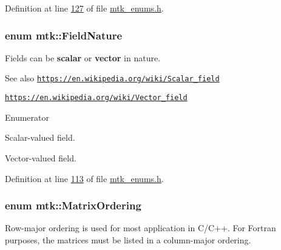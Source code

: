 Definition at line \hyperlink{mtk__enums_8h_source_l00127}{127} of file \hyperlink{mtk__enums_8h_source}{mtk\+\_\+enums.\+h}.

\hypertarget{group__c02-enums_ga4c54f2a329cfb4e56213b02a259d19e2}{
\subsubsection[{Field\+Nature}]{\setlength{\rightskip}{0pt plus 5cm}enum {\bf mtk\+::\+Field\+Nature}}}\label{group__c02-enums_ga4c54f2a329cfb4e56213b02a259d19e2}
Fields can be {\bfseries scalar} or {\bfseries vector} in nature.

\begin{DoxySeeAlso}{See also}
\href{https://en.wikipedia.org/wiki/Scalar_field}{\tt https\+://en.\+wikipedia.\+org/wiki/\+Scalar\+\_\+field}

\href{https://en.wikipedia.org/wiki/Vector_field}{\tt https\+://en.\+wikipedia.\+org/wiki/\+Vector\+\_\+field} 
\end{DoxySeeAlso}
\begin{Desc}
\item[Enumerator]\par
\begin{description}
\item[{\em 
\hypertarget{group__c02-enums_ga4c54f2a329cfb4e56213b02a259d19e2af481d45bd70d41381c7d72e200889205}{S\+C\+A\+L\+A\+R}\label{group__c02-enums_ga4c54f2a329cfb4e56213b02a259d19e2af481d45bd70d41381c7d72e200889205}
}]Scalar-\/valued field. \item[{\em 
\hypertarget{group__c02-enums_ga4c54f2a329cfb4e56213b02a259d19e2a3d8cb27a993651a74d67fb8c98ae91b2}{V\+E\+C\+T\+O\+R}\label{group__c02-enums_ga4c54f2a329cfb4e56213b02a259d19e2a3d8cb27a993651a74d67fb8c98ae91b2}
}]Vector-\/valued field. \end{description}
\end{Desc}


Definition at line \hyperlink{mtk__enums_8h_source_l00113}{113} of file \hyperlink{mtk__enums_8h_source}{mtk\+\_\+enums.\+h}.

\hypertarget{group__c02-enums_ga622801bd9f912d0f976c3e383f5f581c}{
\subsubsection[{Matrix\+Ordering}]{\setlength{\rightskip}{0pt plus 5cm}enum {\bf mtk\+::\+Matrix\+Ordering}}}\label{group__c02-enums_ga622801bd9f912d0f976c3e383f5f581c}
Row-\/major ordering is used for most application in C/\+C++. For Fortran purposes, the matrices must be listed in a column-\/major ordering.

